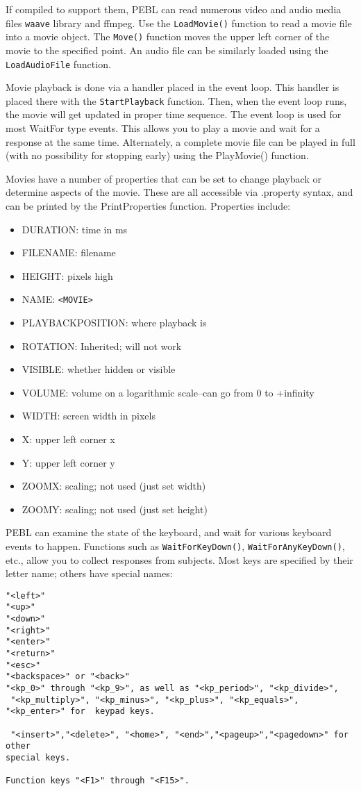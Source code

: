 
If compiled to support them, PEBL can read numerous video and audio
media files \texttt{waave} library and ffmpeg.  Use the
\texttt{LoadMovie()} function to read a movie file into a movie
object.  The \texttt{Move()} function moves the upper left corner of the movie to the
specified point.  An audio file can be similarly loaded using the \texttt{LoadAudioFile} function.

Movie playback is done via a handler placed in the event loop.  This handler is placed there with the \texttt{StartPlayback} function.  Then, when the event loop runs, the movie will get updated in proper time sequence.  The event loop is used for most WaitFor type events.  This allows you to play a movie and wait for a response at the same time.  Alternately, a complete movie file can be played in full (with no possibility for stopping early) using the PlayMovie() function.

Movies have a number of properties that can be set to change playback or determine aspects of the movie. These are all accessible via .property syntax, and can be printed by the PrintProperties function.  Properties include:
\begin{itemize}
\item DURATION: time in ms
\item FILENAME: filename
\item HEIGHT: pixels high
\item NAME: \verb+<MOVIE>+
\item PLAYBACKPOSITION: where playback is
\item ROTATION: Inherited; will not work 
\item VISIBLE: whether hidden or visible
\item VOLUME: volume on a logarithmic scale--can go from 0 to +infinity
\item WIDTH: screen width in pixels
\item X:  upper left corner x
\item Y:  upper left corner y
\item ZOOMX: scaling; not used (just set width)
\item ZOOMY: scaling; not used (just set height)
\end{itemize}



PEBL can examine the state of the keyboard, and wait for various
keyboard events to happen. Functions such as
\texttt{WaitForKeyDown()}, \texttt{WaitForAnyKeyDown()}, etc., allow
you to collect responses from subjects. Most keys are specified by
their letter name; others have special names:
\begin{verbatim}
"<left>"
"<up>"
"<down>"
"<right>"
"<enter>"
"<return>"
"<esc>"
"<backspace>" or "<back>"
"<kp_0>" through "<kp_9>", as well as "<kp_period>", "<kp_divide>",
 "<kp_multiply>", "<kp_minus>", "<kp_plus>", "<kp_equals>",
"<kp_enter>" for  keypad keys.

 "<insert>","<delete>", "<home>", "<end>","<pageup>","<pagedown>" for other
special keys.

Function keys "<F1>" through "<F15>".
\end{verbatim}

